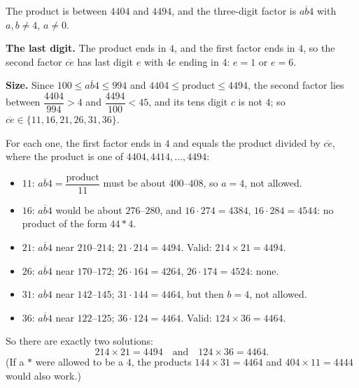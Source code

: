 The product is between $4404$ and $4494$, and the three-digit factor is $\overline{ab4}$ with $a,b\ne4$, $a\ne0$.

\textbf{The last digit.} The product ends in $4$, and the first factor ends in $4$, so the second factor $\overline{ce}$ has last digit $e$ with $4e$ ending in $4$: $e=1$ or $e=6$.

\textbf{Size.} Since $100\le\overline{ab4}\le994$ and $4404\le\text{product}\le4494$, the second factor lies between $\dfrac{4404}{994}>4$ and $\dfrac{4494}{100}<45$, and its tens digit $c$ is not $4$; so $\overline{ce}\in\{11,16,21,26,31,36\}$.

For each one, the first factor ends in $4$ and equals the product divided by $\overline{ce}$, where the product is one of $4404,4414,\dots,4494$:
\begin{itemize}
\item $11$: $\overline{ab4}=\dfrac{\text{product}}{11}$ must be about $400$--$408$, so $a=4$, not allowed.
\item $16$: $\overline{ab4}$ would be about $276$--$280$, and $16\cdot274=4384$, $16\cdot284=4544$: no product of the form $44*4$.
\item $21$: $\overline{ab4}$ near $210$--$214$; $21\cdot214=4494$. Valid: $214\times21=4494$.
\item $26$: $\overline{ab4}$ near $170$--$172$; $26\cdot164=4264$, $26\cdot174=4524$: none.
\item $31$: $\overline{ab4}$ near $142$--$145$; $31\cdot144=4464$, but then $b=4$, not allowed.
\item $36$: $\overline{ab4}$ near $122$--$125$; $36\cdot124=4464$. Valid: $124\times36=4464$.
\end{itemize}
So there are exactly two solutions:
\[
\boxed{214\times21=4494\quad\text{and}\quad124\times36=4464}.
\]
(If a $*$ were allowed to be a $4$, the products $144\times31=4464$ and $404\times11=4444$ would also work.)
